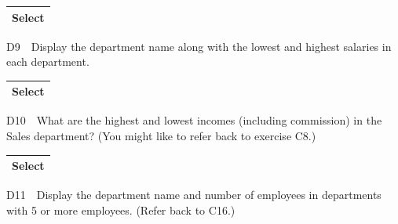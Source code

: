 \begin{flushleft}
\tablefirsthead{}
\tablehead{}
\tabletail{}
\tablelasttail{}
\begin{supertabular}{|m{14.793cm}|}
\hline
Select

\\\hline
\end{supertabular}
\end{flushleft}
D9\ \ Display the department name along with the lowest and highest salaries in each department.

\begin{flushleft}
\tablefirsthead{}
\tablehead{}
\tabletail{}
\tablelasttail{}
\begin{supertabular}{|m{14.583cm}|}
\hline
Select

\\\hline
\end{supertabular}
\end{flushleft}
D10\ \ What are the highest and lowest incomes (including commission) in the Sales department?  (You might like to refer back to exercise C8.)

\begin{flushleft}
\tablefirsthead{}
\tablehead{}
\tabletail{}
\tablelasttail{}
\begin{supertabular}{|m{14.583cm}|}
\hline
Select

\\\hline
\end{supertabular}
\end{flushleft}
D11\ \ Display the department name and number of employees in departments with 5 or more employees.  (Refer back to C16.)

